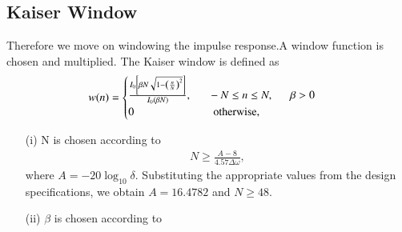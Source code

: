 \documentclass{article}
\begin{document}
\subsection{Kaiser Window}
Therefore we move on windowing the impulse response.A window function is chosen and multiplied. The Kaiser window is defined as
\begin{align}
    w(n) =
    \begin{cases}
    \frac{I_0\left[ \beta N \sqrt{1 - \left(\frac{n}{N}\right)^2} \right]}{I_0(\beta N)},
\indent -N \leq n \leq N, \indent \beta > 0 \nonumber \\
 0 \hspace{2.5 cm} \mbox{otherwise,}
 \end{cases}
\end{align}
\begin{enumerate}
    \item[(i)] N is chosen according to
\begin{align}
    N \geq \frac{A-8}{4.57\Delta \omega},
\end{align}
where $A = -20\log_{10}\delta$.  Substituting the appropriate values from the design specifications, we obtain
$A = 16.4782$ and $N \geq 48$.
\item[(ii)] $\beta$ is chosen according to


\end{enumerate}
\end{document}
